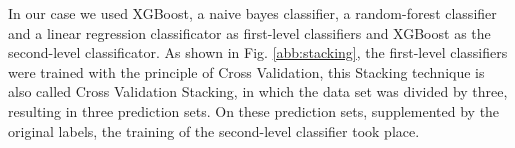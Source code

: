 In our case we used XGBoost, a naive bayes classifier, a random-forest classifier and a linear regression classificator as first-level classifiers and XGBoost as the second-level classificator. As shown in Fig. \ref{abb:stacking}, the first-level classifiers were trained with the principle of Cross Validation, this Stacking technique is also called Cross Validation Stacking, in which the data set was divided by three, resulting in three prediction sets. On these prediction sets, supplemented by the original labels, the training of the second-level classifier took place. 
